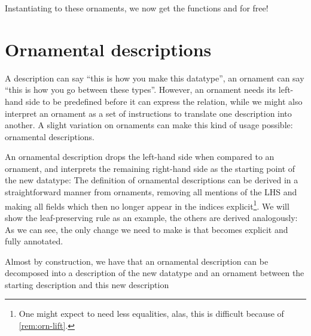 Instantiating  to these ornaments, we now get the functions  and  for free!



\section{Ornamental descriptions}
A description can say ``this is how you make this datatype'', an ornament can say ``this is how you go between these types''. However, an ornament needs its left-hand side to be predefined before it can express the relation, while we might also interpret an ornament as a set of instructions to translate one description into another. A slight variation on ornaments can make this kind of usage possible: ornamental descriptions.

An ornamental description drops the left-hand side when compared to an ornament, and interprets the remaining right-hand side as the starting point of the new datatype:
The definition of ornamental descriptions can be derived in a straightforward manner from ornaments, removing all mentions of the LHS and making all fields which then no longer appear in the indices explicit\footnote{One might expect to need less equalities, alas, this is difficult because of \autoref{rem:orn-lift}.}. We will show the leaf-preserving rule as an example, the others are derived analogously:
As we can see, the only change we need to make is that  becomes explicit and fully annotated.

Almost by construction, we have that an ornamental description can be decomposed into a description of the new datatype
and an ornament between the starting description and this new description


